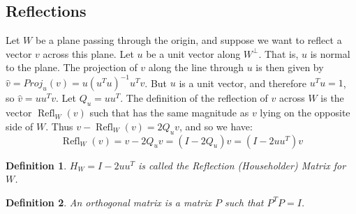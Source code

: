 \documentclass{article}
\theoremstyle{mystyle}
\newtheorem{definition}{Definition}[section]
\DeclareMathOperator{\Refl}{Refl}
\begin{document}
\subsection{Reflections}
Let $W$ be a plane passing through the origin, and suppose we want to reflect a vector $v$ across this plane. Let $u$ be a unit vector along $W^{\perp}$. That is, $u$ is normal to the plane. The projection of $v$ along the line through $u$ is then given by $\hat{v} = Proj_{u}(v) = u(u^Tu)^{-1}u^Tv$. But $u$ is a unit vector, and therefore $u^Tu = 1$, so $\hat{v} = uu^T v$. Let $Q_u = uu^T$. The definition of the reflection of $v$ across $W$ is the vector $\Refl_{W}(v)$ such that has the same magnitude as $v$ lying on the opposite side of $W$. Thus $v-\Refl_{W}(v) = 2Q_u v$, and so we have:
\begin{equation*}
    \Refl_{W}(v) = v-2Q_u v = (I-2Q_u)v =(I-2uu^T)v
\end{equation*}
\begin{definition}
$H_{W} = I-2uu^T$ is called the Reflection (Householder) Matrix for $W$.
\end{definition}
\begin{definition}
An orthogonal matrix is a matrix $P$ such that $P^TP = I$.
\end{definition}
\end{document}
